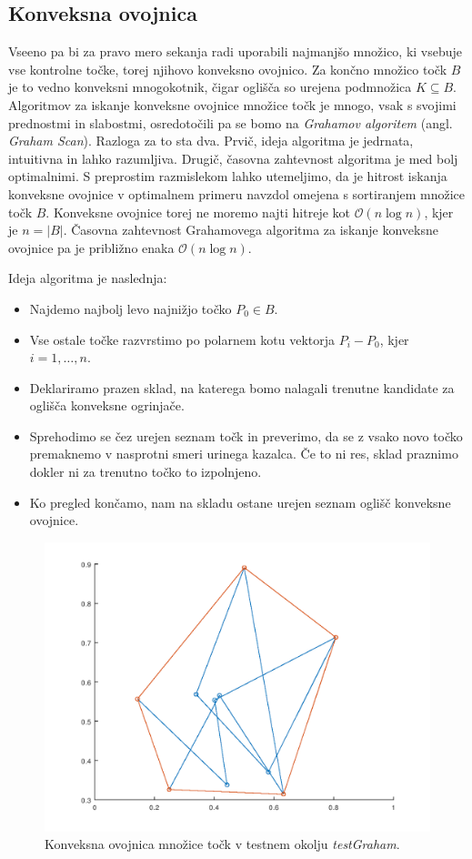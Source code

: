 \documentclass[a4paper, 12pt]{article} %
\begin{document}
\subsection{Konveksna ovojnica}
Vseeno pa bi za pravo mero sekanja radi uporabili najmanjšo množico, ki vsebuje vse kontrolne točke, torej njihovo konveksno ovojnico. Za končno množico točk $B$ je to vedno konveksni mnogokotnik, čigar oglišča so urejena podmnožica $K \subseteq B$. Algoritmov za iskanje konveksne ovojnice množice točk je mnogo, vsak s svojimi prednostmi in slabostmi, osredotočili pa se bomo na \emph{Grahamov algoritem} (angl. \emph{Graham Scan}). Razloga za to sta dva. Prvič, ideja algoritma je jedrnata, intuitivna in lahko razumljiva. Drugič, časovna zahtevnost algoritma je med bolj optimalnimi. S preprostim razmislekom lahko utemeljimo, da je hitrost iskanja konveksne ovojnice v optimalnem primeru navzdol omejena s sortiranjem množice točk $B$. Konveksne ovojnice torej ne moremo najti hitreje kot $\mathcal{O}(n\log{}n)$, kjer je $n = |B|$. Časovna zahtevnost Grahamovega algoritma za iskanje konveksne ovojnice pa je približno enaka $\mathcal{O}(n\log{}n)$.



Ideja algoritma je naslednja:
\begin{itemize}
\item Najdemo najbolj levo najnižjo točko $P_0 \in B$.
\item Vse ostale točke razvrstimo po polarnem kotu vektorja $P_i - P_0$, kjer $i = 1, \dots, n$.
\item Deklariramo prazen sklad, na katerega bomo nalagali trenutne kandidate za oglišča konveksne ogrinjače.
\item Sprehodimo se čez urejen seznam točk in preverimo, da se z vsako novo točko premaknemo v nasprotni smeri urinega kazalca. Če to ni res, sklad praznimo dokler ni za trenutno točko to izpolnjeno.
\item Ko pregled končamo, nam na skladu ostane urejen seznam oglišč konveksne ovojnice.
\end{itemize}

\begin{figure}[!h]
	\centering
	\includegraphics[scale=0.5]{graham}
	\caption{Konveksna ovojnica množice točk v testnem okolju \emph{testGraham}.}
	\label{fig:graham}
\end{figure}
\end{document}
